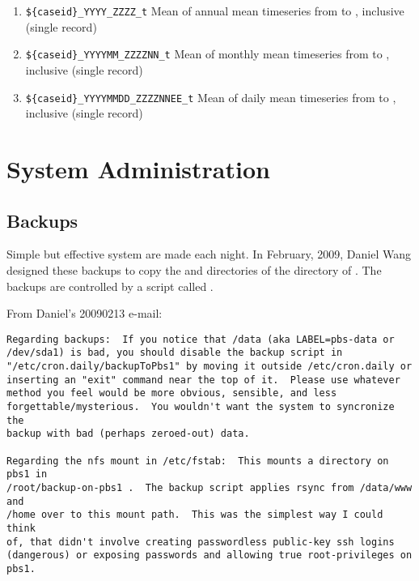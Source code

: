 \documentclass[12pt,twoside]{article}
\begin{document}
\begin{enumerate}
\item \verb'${caseid}_YYYY_ZZZZ_t' Mean of annual mean timeseries from
 to , inclusive (single record)
\item \verb'${caseid}_YYYYMM_ZZZZNN_t' Mean of monthly mean timeseries from
 to , inclusive (single record)
\item \verb'${caseid}_YYYYMMDD_ZZZZNNEE_t' Mean of daily mean timeseries from
 to , inclusive (single record)
\end{enumerate}

\clearpage

\section{System Administration}\label{sxn:sys}
\subsection{Backups}\label{sxn:bck}
Simple but effective system  are made each night.
In February, 2009, Daniel Wang designed these backups to copy the
 and  directories of
 the  directory of  
. 
The backups are controlled by a  script called
.

From Daniel's 20090213 e-mail:
\begin{verbatim}
Regarding backups:  If you notice that /data (aka LABEL=pbs-data or 
/dev/sda1) is bad, you should disable the backup script in
"/etc/cron.daily/backupToPbs1" by moving it outside /etc/cron.daily or
inserting an "exit" command near the top of it.  Please use whatever
method you feel would be more obvious, sensible, and less
forgettable/mysterious.  You wouldn't want the system to syncronize the
backup with bad (perhaps zeroed-out) data.

Regarding the nfs mount in /etc/fstab:  This mounts a directory on pbs1 in
/root/backup-on-pbs1 .  The backup script applies rsync from /data/www and
/home over to this mount path.  This was the simplest way I could think
of, that didn't involve creating passwordless public-key ssh logins
(dangerous) or exposing passwords and allowing true root-privileges on
pbs1.
\end{verbatim}
\end{document}
